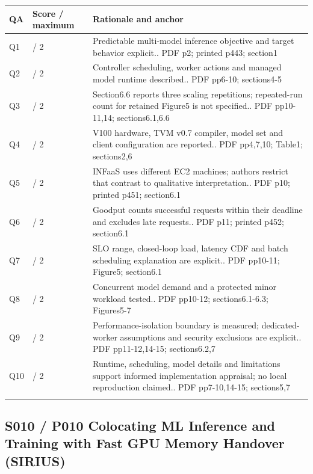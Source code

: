 \begin{longtable}{>{\raggedright\arraybackslash}p{}>{\raggedright\arraybackslash}p{}>{\raggedright\arraybackslash}p{}}
\toprule
\textbf{QA} & \textbf{Score / maximum} & \textbf{Rationale and anchor}\\\midrule\endhead
Q1 & 2 / 2 & Predictable multi-model inference objective and target behavior explicit.. PDF p2; printed p443; section1\\\addlinespace
Q2 & 2 / 2 & Controller scheduling, worker actions and managed model runtime described.. PDF pp6-10; sections4-5\\\addlinespace
Q3 & 1 / 2 & Section6.6 reports three scaling repetitions; repeated-run count for retained Figure5 is not specified.. PDF pp10-11,14; sections6.1,6.6\\\addlinespace
Q4 & 2 / 2 & V100 hardware, TVM v0.7 compiler, model set and client configuration are reported.. PDF pp4,7,10; Table1; sections2,6\\\addlinespace
Q5 & 1 / 2 & INFaaS uses different EC2 machines; authors restrict that contrast to qualitative interpretation.. PDF p10; printed p451; section6.1\\\addlinespace
Q6 & 2 / 2 & Goodput counts successful requests within their deadline and excludes late requests.. PDF p11; printed p452; section6.1\\\addlinespace
Q7 & 2 / 2 & SLO range, closed-loop load, latency CDF and batch scheduling explanation are explicit.. PDF pp10-11; Figure5; section6.1\\\addlinespace
Q8 & 2 / 2 & Concurrent model demand and a protected minor workload tested.. PDF pp10-12; sections6.1-6.3; Figures5-7\\\addlinespace
Q9 & 2 / 2 & Performance-isolation boundary is measured; dedicated-worker assumptions and security exclusions are explicit.. PDF pp11-12,14-15; sections6.2,7\\\addlinespace
Q10 & 2 / 2 & Runtime, scheduling, model details and limitations support informed implementation appraisal; no local reproduction claimed.. PDF pp7-10,14-15; sections5,7\\\addlinespace
\bottomrule\end{longtable}

\clearpage\subsection{S010 / P010 Colocating ML Inference and Training with Fast GPU Memory Handover (SIRIUS)}

